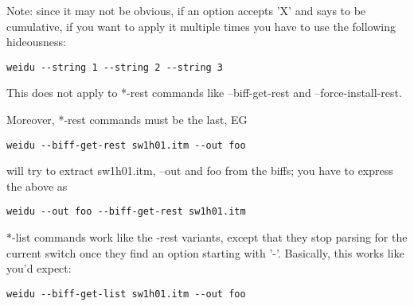 \documentclass{article}
\begin{document}
Note: since it may not be obvious, if an option accepts 'X' and says to be
cumulative, if you want to apply it multiple times you have to use the following
hideousness:
\begin{verbatim}
weidu --string 1 --string 2 --string 3
\end{verbatim}
This does not apply to *-rest commands like --biff-get-rest and --force-install-rest.

Moreover, *-rest commands must be the last, EG
\begin{verbatim}
weidu --biff-get-rest sw1h01.itm --out foo
\end{verbatim}
will try to extract sw1h01.itm, --out and foo from the biffs; you have to express the above as
\begin{verbatim}
weidu --out foo --biff-get-rest sw1h01.itm
\end{verbatim}

*-list commands work like the -rest variants, except that they stop parsing for the current
switch once they find an option starting with '-'. Basically, this works like you'd expect:
\begin{verbatim}
weidu --biff-get-list sw1h01.itm --out foo
\end{verbatim}


\
\end{document}
